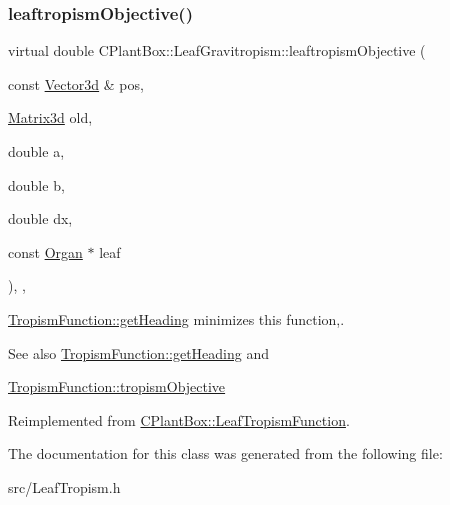 \subsubsection{\texorpdfstring{leaftropism\+Objective()}{leaftropismObjective()}}
{\footnotesize\ttfamily virtual double C\+Plant\+Box\+::\+Leaf\+Gravitropism\+::leaftropism\+Objective (\begin{DoxyParamCaption}\item[{const \hyperlink{classCPlantBox_1_1Vector3d}{Vector3d} \&}]{pos,  }\item[{\hyperlink{classCPlantBox_1_1Matrix3d}{Matrix3d}}]{old,  }\item[{double}]{a,  }\item[{double}]{b,  }\item[{double}]{dx,  }\item[{const \hyperlink{classCPlantBox_1_1Organ}{Organ} $\ast$}]{leaf }\end{DoxyParamCaption})\hspace{0.3cm}{\ttfamily [inline]}, {\ttfamily [override]}, {\ttfamily [virtual]}}



\hyperlink{classCPlantBox_1_1TropismFunction_adb52b88734a94fe1365a00e02c7e6be5}{Tropism\+Function\+::get\+Heading} minimizes this function,. 

\begin{DoxySeeAlso}{See also}
\hyperlink{classCPlantBox_1_1TropismFunction_adb52b88734a94fe1365a00e02c7e6be5}{Tropism\+Function\+::get\+Heading} and 

\hyperlink{classCPlantBox_1_1TropismFunction_a4f2c79fff55d1398c98a070dd8ebbe08}{Tropism\+Function\+::tropism\+Objective} 
\end{DoxySeeAlso}


Reimplemented from \hyperlink{classCPlantBox_1_1LeafTropismFunction_ab89f5f7e80103d80681bc8cadc220dba}{C\+Plant\+Box\+::\+Leaf\+Tropism\+Function}.



The documentation for this class was generated from the following file\+:\begin{DoxyCompactItemize}
\item 
src/Leaf\+Tropism.\+h\end{DoxyCompactItemize}
